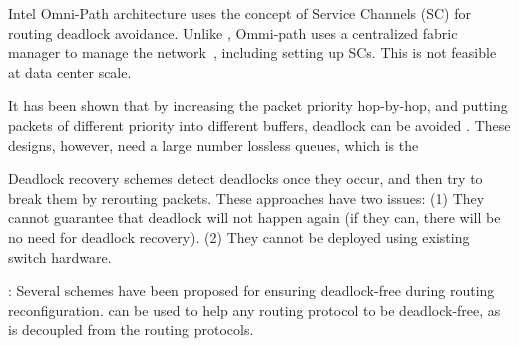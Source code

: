  Intel Omni-Path architecture \cite{omnipath} uses the
concept of Service Channels (SC) for routing deadlock avoidance.  Unlike
\sysname{}, Ommi-path uses a centralized fabric manager to manage the
network~\cite{omnipath}, including setting up SCs. This is not feasible at
data center scale.


 It has been shown that by
increasing the packet priority hop-by-hop, and putting packets of different
priority into different buffers, deadlock can be avoided
\cite{firstpaper,survey,datanetworks,karol2003prevention}. These designs,
however, need a large number lossless queues, which is the 


 Deadlock recovery schemes
\cite{isca95,shpiner2016unlocking,venkatramani1996,martinez1997,Lopez1998}
detect deadlocks once they occur, and then try to break them by rerouting
packets.  These approaches have two issues: (1) They cannot guarantee that
deadlock will not happen again (if they can, there will be no need for deadlock
recovery). (2) They cannot be deployed using existing switch hardware.



:
Several schemes
\cite{automatic,lysne2005,doublescheme,gara2005} have been proposed for
ensuring deadlock-free during routing reconfiguration. \sysname{} can
be used to help any routing protocol to be deadlock-free, as
\sysname{} is decoupled from the routing protocols.

